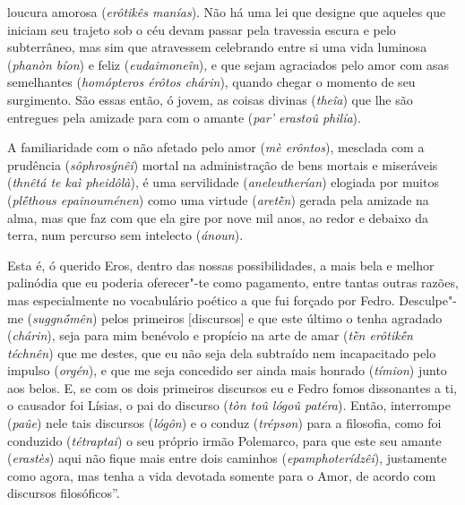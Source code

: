loucura amorosa (\emph{erôtikês manías}). Não há uma lei que designe que
aqueles que iniciam seu trajeto sob o céu devam passar pela travessia
escura e pelo subterrâneo, mas sim que atravessem celebrando entre si
uma vida luminosa (\emph{phanòn bíon}) e feliz (\emph{eudaimoneîn}),
\bekker{[256e]} e que sejam agraciados pelo amor com asas semelhantes
(\emph{homópteros érôtos chárin}), quando chegar o momento de seu
surgimento. São essas então, ó jovem, as coisas divinas (\emph{theîa})
que lhe são entregues pela amizade para com o amante (\emph{par'
erastoû philía}).

A familiaridade com o não afetado pelo amor (\emph{mè erôntos}),
mesclada com a prudência (\emph{sôphrosýnêi}) mortal na administração de
bens mortais e miseráveis (\emph{thnêtá te kaì pheidôlà}), é uma
servilidade (\emph{aneleutherían}) elogiada por muitos (\emph{plḗthous
epainouménen}) como uma virtude (\emph{aretḕn}) gerada pela amizade na
alma, \bekker{[257a]} mas que faz com que ela gire por nove mil anos, ao
redor e debaixo da terra, num percurso sem intelecto (\emph{ánoun}).

Esta é, ó querido Eros, dentro das nossas possibilidades, a mais bela e
melhor palinódia que eu poderia oferecer"-te como pagamento, entre tantas
outras razões, mas especialmente no vocabulário poético a que fui
forçado por Fedro. Desculpe"-me (\emph{suggnṓmên}) pelos primeiros
[discursos] e que este último o tenha agradado (\emph{chárin}), seja
para mim benévolo e propício na arte de amar (\emph{tḕn erôtikḗn
téchnên}) que me destes, que eu não seja dela subtraído nem incapacitado
pelo impulso (\emph{orgén}), e que me seja concedido ser ainda mais
honrado (\emph{tímion}) junto aos belos. \bekker{[257b]} E, se com os dois
primeiros discursos eu e Fedro fomos dissonantes a ti, o causador foi
Lísias, o pai do discurso (\emph{tòn toû lógoû patéra}). Então,
interrompe (\emph{paûe}) nele tais discursos (\emph{lógôn}) e o conduz
(\emph{trépson}) para a filosofia, como foi conduzido (\emph{tétraptai})
o seu próprio irmão Polemarco, para que este seu amante (\emph{erastès})
aqui não fique mais entre dois caminhos (\emph{epamphoterídzêi}),
justamente como agora, mas tenha a vida devotada somente para o Amor, de
acordo com discursos filosóficos''.

